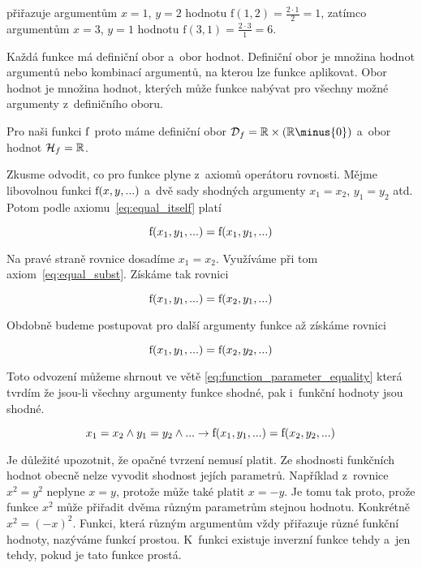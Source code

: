 přiřazuje argumentům \(x = 1\), \(y = 2\) hodnotu \(\mathrm{f}(1, 2) = \frac{2 \cdot 1}{2} = 1\), zatímco argumentům \(x = 3\), \(y = 1\) hodnotu \(\mathrm{f}(3, 1) = \frac{2 \cdot 3}{1} = 6\).

Každá funkce má definiční obor a~obor hodnot. Definiční obor je množina hodnot argumentů nebo kombinací argumentů, na kterou lze funkce aplikovat. Obor hodnot je množina hodnot, kterých může funkce nabývat pro všechny možné argumenty z~definičního oboru.

Pro naši funkci \(\mathrm{f}\) proto máme definiční obor \(\domain{f} = \real \times (\real \minus \{0\}) \) a~obor hodnot \(\mathcal{H}_{f} = \mathbb{R}\).

Zkusme odvodit, co pro funkce plyne z~axiomů operátoru rovnosti. Mějme libovolnou funkci \(\mathrm{f}(x, y, ...)\) a~dvě sady shodných argumenty \(x_1 = x_2\), \(y_1 = y_2\) atd. Potom podle axiomu~\eqref{eq:equal_itself} platí

\begin{equation}
\mathrm{f}(x_1, y_1, ...) = \mathrm{f}(x_1, y_1, ...)
\end{equation}

Na pravé straně rovnice dosadíme \(x_1 = x_2\). Využíváme při tom axiom~\eqref{eq:equal_subst}. Získáme tak rovnici

\begin{equation}
\mathrm{f}(x_1, y_1, ...) = \mathrm{f}(x_2, y_1, ...)
\end{equation}

Obdobně budeme postupovat pro další argumenty funkce až získáme rovnici

\begin{equation}
\mathrm{f}(x_1, y_1, ...) = \mathrm{f}(x_2, y_2, ...)
\end{equation}

Toto odvození můžeme shrnout ve větě \eqref{eq:function_parameter_equality} která tvrdím že jsou-li všechny argumenty funkce shodné, pak i~funkční hodnoty jsou shodné. 

\begin{fact}
\begin{equation}
\label{eq:function_parameter_equality}
x_1 = x_2 \land y_1 = y_2 \land ... \rightarrow \mathrm{f}(x_1, y_1, ...) = \mathrm{f}(x_2, y_2, ...)
\end{equation}
\end{fact}

Je důležité upozotnit, že opačné tvrzení nemusí platit. Ze shodnosti funkčních hodnot obecně nelze vyvodit shodnost jejích parametrů. Například z~rovnice \(x^2 = y^2\) neplyne \(x = y\), protože může také platit \(x = -y\). Je tomu tak proto, prože funkce \(x^2\) může přiřadit dvěma různým parametrům stejnou hodnotu. Konkrétně \(x^2 = (-x)^2\). Funkci, která různým argumentům vždy přiřazuje různé funkční hodnoty, nazýváme funkcí prostou. K~funkci existuje inverzní funkce tehdy a~jen tehdy, pokud je tato funkce prostá.

